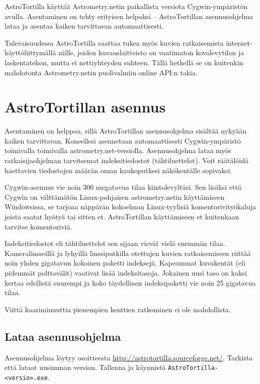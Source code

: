 \documentclass{article}
\newcommand{\surl}[1]{{\small \url{#1}}}
\begin{document}
AstroTortilla käyttää Astrometry.netin paikallista versiota Cygwin-ympäristön avulla.
Asentaminen on tehty erityisen helpoksi -- AstroTortillan asennusohjelma lataa ja 
asentaa kaiken tarvittavan automaattisesti.

Tulevaisuudessa AstroTortilla saattaa tukea myös kuvien ratkaisemista internet-käyttöliittymällä
niille, joiden kuvauslaitteisto on vaatimaton kovalevytilan ja laskentatehon, mutta ei nettiyhteyden suhteen.
Tällä hetkellä se on kuitenkin mahdotonta Astrometry.netin puolivalmiin online API:n takia.

\newpage

\section{AstroTortillan asennus}

Asentaminen on helppoa, sillä AstroTortillan asennusohjelma sisältää nykyään
kaiken tarvittavan. Koneellesi asennetaan automaattisesti Cygwin-ympäristö toimivalla
toimivalla astrometry.net-versiolla. Asennusohjelma lataa myös ratkaisijaohjelman tarvitsemat
indeksitiedostot (tähtiluettelot). Voit räätälöidä haettavien tiedostojen määrän oman kaukoputkesi näkökentälle sopivaksi.

Cygwin-asennus vie noin 300 megatavua tilaa kiintolevyltäsi. Sen lisäksi että Cygwin on
välttämätön Linux-pohjaisen astrometry.netin käyttämiseen Windowsissa, se tarjoaa 
näppärän kokoelman Linux-tyylisiä komentorivityökaluja joista saatat hyötyä tai sitten et.
AstroTortillan käyttämiseen et kuitenkaan tarvitse komentoriviä.

Indeksitiedostot eli tähtiluettelot sen sijaan vievät vielä enemmän tilaa. 
Kameralinsseillä ja lyhyillä linssiputkilla otettujen kuvien ratkaisemiseen 
riittää noin yhden gigatavun kokoinen paketti indeksejä. Kapeammat kuvakentät 
(eli pidemmät polttovälit) vaativat lisää indeksitasoja. Jokainen uusi taso on 
kaksi kertaa edellistä suurempi ja koko täydellinen indeksipaketti vie noin 25 gigatavua tilaa.

Viittä kaariminuuttia pienempien kenttien ratkominen ei ole mahdollista.

\subsection{Lataa asennusohjelma}

Asennusohjelma löytyy osoitteesta \surl{http://astrotortilla.sourceforge.net/}. 
Tarkista että lataat uusimman version. Tallenna ja käynnistä \texttt{AstroTortilla-<versio>.exe}. 
\end{document}
